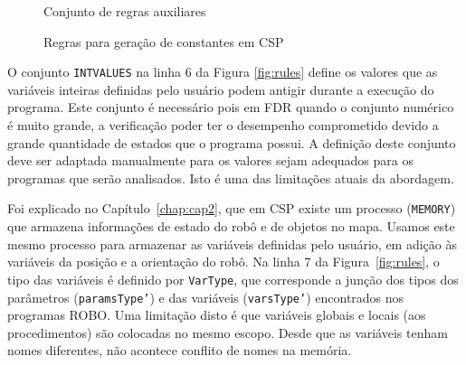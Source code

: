 \begin{figure}[!h]
\centering
\caption{Conjunto de regras auxiliares}

\label{fig:rules2}
\end{figure}

\begin{figure}[!h]
\centering
\caption{Regras para geração de constantes em CSP}

\label{fig:rules_constants}
\end{figure}

O conjunto \texttt{INTVALUES} na linha 6 da Figura \ref{fig:rules} define os valores que as variáveis inteiras definidas pelo usuário podem antigir durante a execução do programa. Este conjunto é necessário pois em FDR quando o conjunto numérico é muito grande, a verificação poder ter o desempenho comprometido devido a grande quantidade de estados que o programa possui. A definição deste conjunto deve ser adaptada manualmente para os valores sejam adequados para os programas que serão analisados. Isto é uma das limitações atuais da abordagem.

Foi explicado no Capítulo~\ref{chap:cap2}, que em CSP existe um processo (\texttt{MEMORY}) que armazena informações de estado do robô e de objetos no mapa. Usamos este mesmo processo para armazenar as variáveis definidas pelo usuário, em adição às variáveis da posição e a orientação do robô. Na linha 7 da Figura~\ref{fig:rules}, o tipo das variáveis é definido por \texttt{VarType}, que corresponde a junção dos tipos dos parâmetros (\texttt{paramsType'}) e das variáveis (\texttt{varsType'}) encontrados nos programas ROBO. Uma limitação disto é que variáveis globais e locais (aos procedimentos) são colocadas no mesmo escopo. Desde que as variáveis tenham nomes diferentes, não acontece conflito de nomes na memória.   

